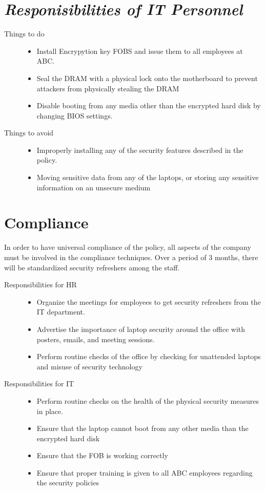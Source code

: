 \documentclass[10pt, twocolumn]{article}
\numberwithin{equation}{section} %
\numberwithin{figure}{section} %
\numberwithin{table}{section} %
\begin{document}
\section{\textit{Responisibilities of IT Personnel}}
\begin{description}
	\item[Things to do] \hfill
		\begin{itemize}
			\item Install Encrypytion key FOBS and issue them to all employees at ABC. 
			\item Seal the DRAM with a physical lock onto the motherboard to prevent attackers from physically stealing the DRAM
			\item Disable booting from any media other than the encrypted hard disk by changing BIOS settings.
		\end{itemize}
	\item[Things to avoid] \hfill
		\begin{itemize}
			\item Improperly installing any of the security features described in the policy.
			\item Moving sensitive data from any of the laptops, or storing any sensitive information on an unsecure medium
		\end{itemize}
\end{description}
\section{Compliance}
In order to have universal compliance of the policy, all aspects of the company must be involved in the compliance techniques.  Over a period of 3 months, there will be standardized security refreshers among the staff.  
\begin{description}
\item[Responsibilities for HR] \hfill
	\begin{itemize}
		\item Organize the meetings for employees to get security refreshers from the IT department. 
		\item Advertise the importance of laptop security around the office with posters, emails, and meeting sessions.
		\item Perform routine checks of the office by checking for unattended laptops and misuse of security technology		
	\end{itemize}
\item[Responsibilities for IT] \hfill
	\begin{itemize}
		\item Perform routine checks on the health of the physical security measures in place.
		\item Ensure that the laptop cannot boot from any other media than the encrypted hard disk
		\item Ensure that the FOB is working correctly 
		\item Ensure that proper training is given to all ABC employees regarding the security policies
	\end{itemize}
\end{description}
\end{document}

